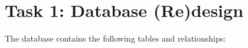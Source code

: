 \documentclass[12pt,a4paper]{article}
\begin{document}
\section{Task 1: Database (Re)design}
The database contains the following tables and relationships:
\end{document}
